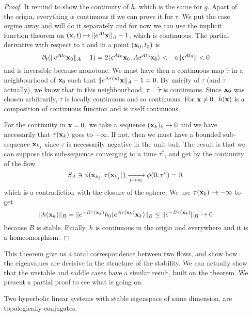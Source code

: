 \begin{proof}
It remind to show the continuity of $h$, which is the same for $g$. Apart of the origin, everything is continuous if we can prove it for $\tau$. We put the case orgine away and will do it separately and for now we can use the implicit function theorem on $(\mathbf{x},t)\mapsto\|e^{At}\mathbf{x}\|_A-1$, which is continuous. The partial derivative with respect to t and in a point $(\mathbf{x}_0,t_0)$ is 
$$\partial_t(\|e^{At_0}\mathbf{x}_0\|_A-1)
=2\langle e^{At_0}\mathbf{x}_0,Ae^{At_0}\mathbf{x}_0\rangle
<-a\|e^{At_0}\| < 0$$
and is inversible because monotone. We must have then a continuous map $\tilde{\tau}$ in a neighbourhood of $\mathbf{x}_0$ such that $\|e^{A\tilde{\tau}(\mathbf{x})}\mathbf{x}\|_A-1=0$. By unicity of $\tau$ (and $\tilde{\tau}$ actually), we know that in this neighbourhood, $\tau=\tilde{\tau}$ is continuous. Since $\mathbf{x}_0$ was chosen arbitrarily, $\tau$ is locally continuous and so continuous. For $\mathbf{x}\neq0$, $h(\mathbf{x})$ is a composition of continuous function and is itself continuous.

For the continuity in $\mathbf{x}=0$, we take a sequence $(\mathbf{x}_k)_k\to0$  and we have necessarily that $\tau(\mathbf{x}_k)$ goes to $-\infty$. If not, then we must have a bounded sub-sequence $\mathbf{x}_{k_j}$ since $\tau$ is necessarily negative in the unit ball. The result is that we can suppose this sub-sequence converging to a time $\tau^*$, and get by the continuity of the flow
$$S_A \ni \phi(\mathbf{x}_{k_j},\tau(\mathbf{x}_{k_j}))
\xrightarrow[j\to\infty]{} \phi(0,\tau^*)=0,$$ which is a contradiction with the closure of the sphere. We use $\tau(\mathbf{x}_k)\to-\infty$ to get 
$$\|h(\mathbf{x}_k)\|_B 
= \|e^{-B\tau(\mathbf{x}_k)}h_0(e^{A\tau(\mathbf{x}_k)}\mathbf{x}_k)\|_B 
\leq \|e^{-B\tau(\mathbf{x}_k)}\|_B\to 0$$
because $B$ is stable. Finally, $h$ is continuous in the origin and everywhere and it is a homeomorphism.
\end{proof}
This theorem give us a total correspondence between two flows, and show how the eigenvalues are decisive in the structure of the stability. We can actually show that the unstable and saddle cases have a similar result, built on the theorem. We present a partial proof to see what is going on. 
\begin{corollaire}
    Two hyperbolic linear systems with stable eigenspace of same dimension, are topologically conjugates.
\end{corollaire}
